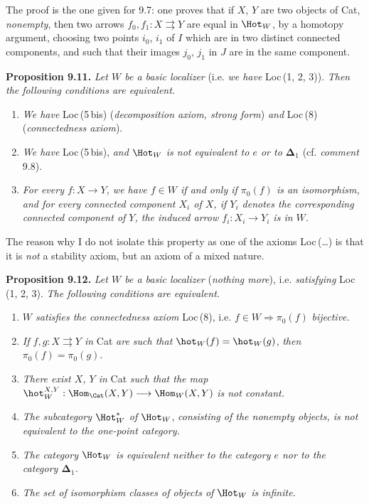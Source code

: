 The proof is the one given for 9.7: one proves that if $X$, $Y$ are two objects of Cat, \textit{nonempty}, then two arrows $f_0,f_1:X\rightrightarrows Y$ are equal in $\Hot_W$, by a homotopy argument, choosing two points $i_0$, $i_1$ of $I$ which are in two distinct connected components, and such that their images $j_0$, $j_1$ in $J$ are in the same component.

\textbf{Proposition 9.11.} \textit{Let $W$ be a basic localizer} (i.e. \textit{we have} Loc\,(1, 2, 3)). \textit{Then the following conditions are equivalent.}
\begin{enumerate}[leftmargin=*]
\item[a)] \textit{We have} Loc\,(5\,bis) (\textit{decomposition axiom, strong form}) \textit{and} Loc\,(8) (\textit{connectedness axiom}).
\item[b)] \textit{We have} Loc\,(5\,bis), \textit{and} $\Hot_W$ \textit{is not equivalent to $e$ or to $\boldsymbol{\Delta}_1$} (cf. \textit{comment} 9.8).
\item[c)] \textit{For every $f:X\longrightarrow Y$, we have $f\in W$ if and only if $\pi_0(f)$ is an isomorphism, and for every connected component $X_i$ of $X$, if $Y_i$ denotes the corresponding connected component of $Y$, the induced arrow $f_i:X_i\longrightarrow Y_i$ is in $W$.}
\end{enumerate}

The reason why I do not isolate this property as one of the axioms Loc\,(\ldots) is that it is \textit{not} a stability axiom, but an axiom of a mixed nature.

\textbf{Proposition 9.12.} \textit{Let $W$ be a basic localizer} (\textit{nothing more}), i.e. \textit{satisfying} Loc\,(1, 2, 3). \textit{The following conditions are equivalent.}
\begin{enumerate}[leftmargin=*]
\item[a)] \textit{$W$ satisfies the connectedness axiom} Loc\,(8), i.e. $f\in W\Longrightarrow\pi_0(f)$ \textit{bijective.}
\item[b)] \textit{If $f,g:X\rightrightarrows Y$ in} Cat \textit{are such that} $\hot_W(f)=\hot_W(g)$, \textit{then} $\pi_0(f)=\pi_0(g)$.
\item[c)] \textit{There exist $X$, $Y$ in} Cat \textit{such that the map} $\hot_W^{X,Y}:\Hom_{\Cat}(X,Y)\longrightarrow\Hom_W(X,Y)$ \textit{is not constant.}
\item[c$'$)] \textit{The subcategory} $\Hot_W^*$ \textit{of} $\Hot_W$, \textit{consisting of the nonempty objects, is not equivalent to the one-point category.}
\item[c$''$)] \textit{The category} $\Hot_W$ \textit{is equivalent neither to the category $e$ nor to the category $\boldsymbol{\Delta}_1$.}
\item[d)] \textit{The set of isomorphism classes of objects of} $\Hot_W$ \textit{is infinite.}
\end{enumerate}


